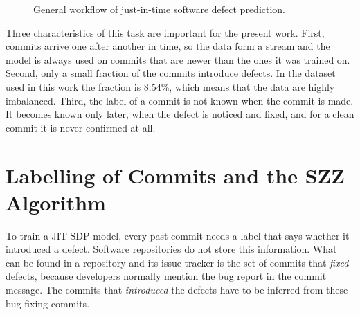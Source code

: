\documentclass[12pt,a4paper,oneside]{report}
\begin{document}
\begin{figure}[htbp]
\centering
{}
\caption{General workflow of just-in-time software defect prediction.}
\label{fig:workflow}
\end{figure}

Three characteristics of this task are important for the present work. First,
commits arrive one after another in time, so the data form a stream and the
model is always used on commits that are newer than the ones it was trained
on. Second, only a small fraction of the commits introduce defects. In the
dataset used in this work the fraction is 8.54\%, which means that the data
are highly imbalanced. Third, the label of a commit is not known when the
commit is made. It becomes known only later, when the defect is noticed and
fixed, and for a clean commit it is never confirmed at all.

\section{Labelling of Commits and the SZZ Algorithm}

To train a JIT-SDP model, every past commit needs a label that says whether
it introduced a defect. Software repositories do not store this information.
What can be found in a repository and its issue tracker is the set of commits
that \emph{fixed} defects, because developers normally mention the bug report
in the commit message. The commits that \emph{introduced} the defects have to
be inferred from these bug-fixing commits.
\end{document}
